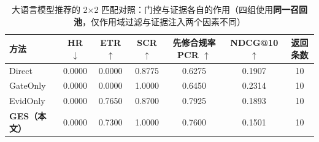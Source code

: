 \begin{table}[htbp]
\centering
\caption{大语言模型推荐的 2×2 匹配对照：门控与证据各自的作用（四组使用\textbf{同一召回池}，仅作用域过滤与证据注入两个因素不同）}
\label{tab:ges-2x2}
\begin{tabular}{lcccccc}
\toprule
方法 & HR $\downarrow$ & ETR $\uparrow$ & SCR $\uparrow$ & 先修合规率 PCR $\uparrow$ & NDCG@10 $\uparrow$ & 返回条数 \\
\midrule
Direct & 0.0000 & 0.0000 & 0.8775 & 0.6275 & 0.1907 & 10 \\
GateOnly & 0.0000 & 0.0000 & 1.0000 & 0.6450 & 0.2314 & 10 \\
EvidOnly & 0.0000 & 0.7650 & 0.8700 & 0.7925 & 0.1893 & 10 \\
\textbf{GES（本文）} & 0.0000 & 0.7300 & 1.0000 & 0.7600 & 0.1501 & 10 \\
\bottomrule
\end{tabular}
\end{table}